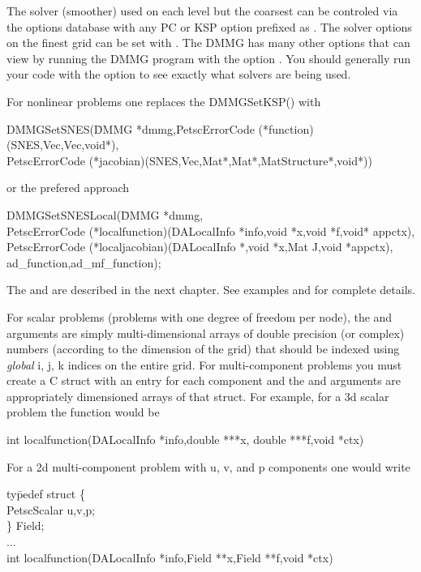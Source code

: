 The solver (smoother) used on each level but the coarsest can be controled via the options
database with any PC or KSP option prefixed as . The 
solver options on the finest grid can be set with  . The 
DMMG has many other options that can view by running the DMMG program with the option .
You should generally run your code with the option  to see exactly what 
solvers are being used.

For nonlinear problems one replaces the DMMGSetKSP() with 
\begin{tabbing}
  DMMGSetSNES(\=DMMG *dmmg,PetscErrorCode (*function)(SNES,Vec,Vec,void*),\\
             \>PetscErrorCode (*jacobian)(SNES,Vec,Mat*,Mat*,MatStructure*,void*))
\end{tabbing}
or the prefered approach
\begin{tabbing}
  DMMGSetSNESLocal(\=DMMG *dmmg,\\
  \>PetscErrorCode (*localfunction)(DALocalInfo *info,void *x,void *f,void* appctx),\\
  \>PetscErrorCode (*localjacobian)(DALocalInfo *,void *x,Mat J,void *appctx),\\
  \>ad\_function,ad\_mf\_function);
\end{tabbing}
The  and  are described in the next chapter. 
See examples  and  for complete details.

For scalar problems (problems with one degree of freedom per node),
the   and  arguments are simply
multi-dimensional arrays of double precision (or complex) numbers
(according to the dimension of the grid) that should be indexed using
{\em global} i, j, k indices on the entire grid. For multi-component
problems you must create a C struct with an entry for each component
and the  and  arguments are appropriately dimensioned
arrays of that struct. For example, for a 3d scalar problem the function
would be 
\begin{tabbing}
int localfunction(DALocalInfo *info,double ***x, double ***f,void *ctx)
\end{tabbing}
For a 2d multi-component problem with u, v, and p components one would write
\begin{tabbing}
ty\=pedef struct \{\\
  \> PetscScalar u,v,p;\\
 \} Field;\\
...\\
int localfunction(DALocalInfo *info,Field **x,Field **f,void *ctx)
\end{tabbing}

